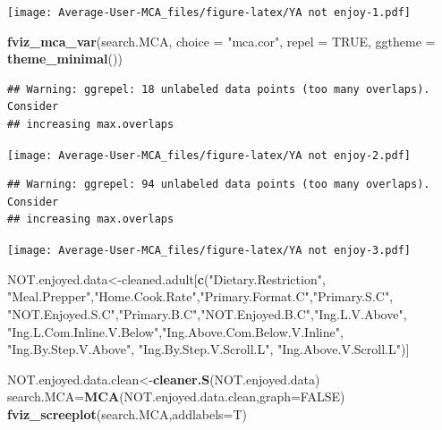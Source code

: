 \documentclass[
]{article}
\newenvironment{Shaded}{\begin{snugshade}}{\end{snugshade}}
\newcommand{\DataTypeTok}[1]{\textcolor[rgb]{0.13,0.29,0.53}{#1}}
\newcommand{\KeywordTok}[1]{\textcolor[rgb]{0.13,0.29,0.53}{\textbf{#1}}}
\newcommand{\NormalTok}[1]{#1}
\newcommand{\OtherTok}[1]{\textcolor[rgb]{0.56,0.35,0.01}{#1}}
\newcommand{\StringTok}[1]{\textcolor[rgb]{0.31,0.60,0.02}{#1}}
\begin{document}
\texttt{[image: Average-User-MCA\_files/figure-latex/YA not enjoy-1.pdf]}

\begin{Shaded}
\begin{Highlighting}[]
\KeywordTok{fviz_mca_var}\NormalTok{(search.MCA, }\DataTypeTok{choice =} \StringTok{"mca.cor"}\NormalTok{, }\DataTypeTok{repel =} \OtherTok{TRUE}\NormalTok{,}
             \DataTypeTok{ggtheme =} \KeywordTok{theme_minimal}\NormalTok{())}
\end{Highlighting}
\end{Shaded}

\begin{verbatim}
## Warning: ggrepel: 18 unlabeled data points (too many overlaps). Consider
## increasing max.overlaps
\end{verbatim}

\texttt{[image: Average-User-MCA\_files/figure-latex/YA not enjoy-2.pdf]}

\begin{Shaded}
\end{Shaded}

\begin{verbatim}
## Warning: ggrepel: 94 unlabeled data points (too many overlaps). Consider
## increasing max.overlaps
\end{verbatim}

\texttt{[image: Average-User-MCA\_files/figure-latex/YA not enjoy-3.pdf]}

\begin{Shaded}
\begin{Highlighting}[]
\NormalTok{NOT.enjoyed.data<-cleaned.adult[}\KeywordTok{c}\NormalTok{(}\StringTok{"Dietary.Restriction"}\NormalTok{, }\StringTok{"Meal.Prepper"}\NormalTok{,}\StringTok{"Home.Cook.Rate"}\NormalTok{,}\StringTok{"Primary.Format.C"}\NormalTok{,}\StringTok{"Primary.S.C"}\NormalTok{,}
            \StringTok{"NOT.Enjoyed.S.C"}\NormalTok{,}\StringTok{"Primary.B.C"}\NormalTok{,}\StringTok{"NOT.Enjoyed.B.C"}\NormalTok{,}\StringTok{"Ing.L.V.Above"}\NormalTok{,}
            \StringTok{"Ing.L.Com.Inline.V.Below"}\NormalTok{,}\StringTok{"Ing.Above.Com.Below.V.Inline"}\NormalTok{,  }\StringTok{"Ing.By.Step.V.Above"}\NormalTok{,  }\StringTok{"Ing.By.Step.V.Scroll.L"}\NormalTok{,}
            \StringTok{"Ing.Above.V.Scroll.L"}\NormalTok{)]}

\NormalTok{NOT.enjoyed.data.clean<-}\KeywordTok{cleaner.S}\NormalTok{(NOT.enjoyed.data)}
\NormalTok{search.MCA=}\KeywordTok{MCA}\NormalTok{(NOT.enjoyed.data.clean,}\DataTypeTok{graph=}\OtherTok{FALSE}\NormalTok{)}
\KeywordTok{fviz_screeplot}\NormalTok{(search.MCA,}\DataTypeTok{addlabels=}\NormalTok{T)}
\end{Highlighting}
\end{Shaded}
\end{document}
